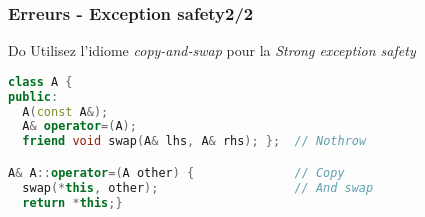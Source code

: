 \documentclass[C++.tex]{subfiles}
\begin{document}
\begin{frame}[fragile]
	\frametitle{Erreurs - Exception safety\titlehfill{}2/2}
	\begin{exampleblock}{Do}
		Utilisez l'idiome \og \textit{copy-and-swap}\fg{} pour la \textit{Strong exception safety}
	\end{exampleblock}


	\begin{lstlisting}[language=C++]
class A {
public:
  A(const A&);
  A& operator=(A);
  friend void swap(A& lhs, A& rhs); };  // Nothrow

A& A::operator=(A other) {              // Copy
  swap(*this, other);                   // And swap
  return *this;}\end{lstlisting}
\end{frame}
\end{document}

